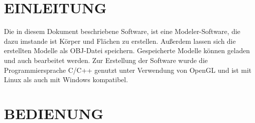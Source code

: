 \newpage
	\section{\Large EINLEITUNG}
	Die in diesem Dokument beschriebene Software, ist eine Modeler-Software, die dazu imstande ist Körper und Flächen zu erstellen. Außerdem lassen sich die erstellten Modelle als OBJ-Datei speichern. Gespeicherte Modelle können geladen und auch bearbeitet werden.\newline
Zur Erstellung der Software wurde die Programmiersprache C/C++ genutzt unter Verwendung von OpenGL und ist mit Linux als auch mit Windows kompatibel.
	
	
	\section{\Large BEDIENUNG}
